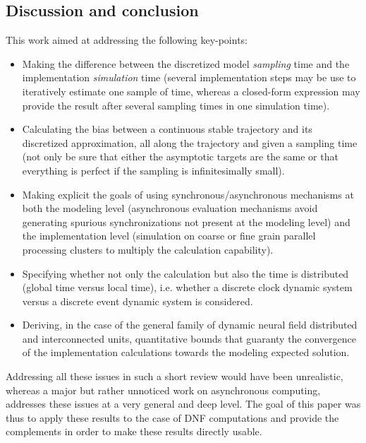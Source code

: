 \subsection{Discussion and conclusion}

This work aimed at addressing the following key-points: 
\begin{itemize}
\item Making the difference between the discretized model {\em sampling} time and the implementation {\em simulation} time (several implementation steps may be use to iteratively estimate one sample of time, whereas a closed-form expression may provide the result after several sampling times in one simulation time).
\item Calculating the bias between a continuous stable trajectory and its discretized approximation, all along the trajectory and given a sampling time (not only be sure that either the asymptotic targets are the same or that everything is perfect if the sampling is infinitesimally small).
\item Making explicit the goals of using synchronous/asynchronous mechanisms at both the modeling level (asynchronous evaluation mechanisms avoid generating spurious synchronizations not present at the modeling level) and the implementation level (simulation on coarse or fine grain parallel processing clusters to multiply the calculation capability). 
\item Specifying whether not only the calculation but also the time is distributed (global time versus local time), i.e. whether a discrete clock dynamic system versus a discrete event dynamic system is considered.
\item Deriving, in the case of the general family of dynamic neural field distributed and interconnected units, quantitative bounds that guaranty the convergence of the implementation calculations towards the modeling expected solution.
\end{itemize}
Addressing all these issues in such a short review would have been unrealistic, whereas a major but rather unnoticed work \cite{Mitra:1987} on asynchronous computing, addresses these issues at a very general and deep level. The goal of this paper was thus to apply these results to the case of DNF computations and provide the complements in order to make these results directly usable.\\

